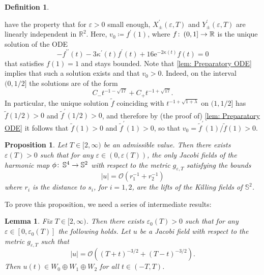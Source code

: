 \documentclass{article}
\numberwithin{equation}{section}        %
\theoremstyle{bfnote}
\newtheorem{prop}[thm]{Proposition}         %
\newtheorem{lem}[thm]{Lemma}                %
\theoremstyle{definition}
\newtheorem{Def}[thm]{Definition}           %
\theoremstyle{bfremark}
\newcommand{\col}{\colon \thinspace}        %
\newcommand{\R}{\mathbb{R}}                 %
\newcommand{\Sp}{\mathbb{S}}                %
\begin{document}
\begin{Def}
\begin{enumerate}
            have the property that for $\varepsilon > 0$ small enough, $X^\prime_\pm(\varepsilon,T)$ and $Y^\prime_\pm(\varepsilon,T)$ are linearly independent in $\R^2$. Here, $v_0 \coloneqq f^\prime(1)$, where $f \col (0,1] \to \mathbb{R}$ is the unique solution of the ODE
                \begin{equation*}
                    -f^{\prime\prime}(t) - 3 \kappa^\prime(t) f^\prime(t) + 16 \mathrm{e}^{-2\kappa(t)} f(t) = 0
                \end{equation*}
            that satisfies $f(1) = 1$ and stays bounded. Note that \cref{lem: Preparatory ODE} implies that such a solution exists and that $v_0 >0$. Indeed, on the interval $(0,1/2]$ the solutions are of the form
            \begin{equation*}
                C_- t^{-1 - \sqrt{17}} + C_+ t^{-1+\sqrt{17}}.
            \end{equation*}
            In particular, the unique solution $\tilde{f}$ coinciding with $t^{-1+\sqrt{1+\lambda}}$ on $(1,1/2]$ has $\tilde{f}(1/2) > 0$ and $\tilde{f}^\prime(1/2)>0$, and therefore by (the proof of) \cref{lem: Preparatory ODE} it follows that $\tilde{f}(1) > 0$ and $\tilde{f}^\prime(1) > 0$, so that $v_0 = \tilde{f}^\prime(1) / \tilde{f}(1) > 0$.
    \end{enumerate}
\end{Def}

\begin{prop}     \label{thm: S^4 to S^2 example}
    Let $T \in [2,\infty)$ be an admissible value. Then there exists $\varepsilon(T) > 0$ such that for any $\varepsilon \in (0,\varepsilon(T))$, the only Jacobi fields of the harmonic map $\phi \col \mathbb{S}^4 \rightarrow \Sp^2$ with respect to the metric $g_{\varepsilon,T}$ satisfying the bounds
    \begin{equation*}
        |u| = \mathcal{O}(r_1^{-1} + r_2^{-1})
    \end{equation*}
    where $r_i$ is the distance to $s_i$, for $i=1,2$, are the lifts of the Killing fields of $\Sp^2$.
\end{prop}

To prove this proposition, we need a series of intermediate results:

\begin{lem}     \label{lem: Finite-dimension restriction}
    Fix $T \in [2,\infty)$. Then there exists $\varepsilon_0(T) > 0$ such that for any $\varepsilon \in [0,\varepsilon_0(T)]$ the following holds. Let $u$ be a Jacobi field with respect to the metric $g_{\varepsilon,T}$ such that
    \begin{equation*}
        |u| = \mathcal{O}((T+t)^{-3/2} + (T-t)^{-3/2}) .
    \end{equation*}
    Then $u(t) \in W_0 \oplus W_1 \oplus W_2$ for all $t \in (-T,T)$.
\end{lem}
\end{document}
